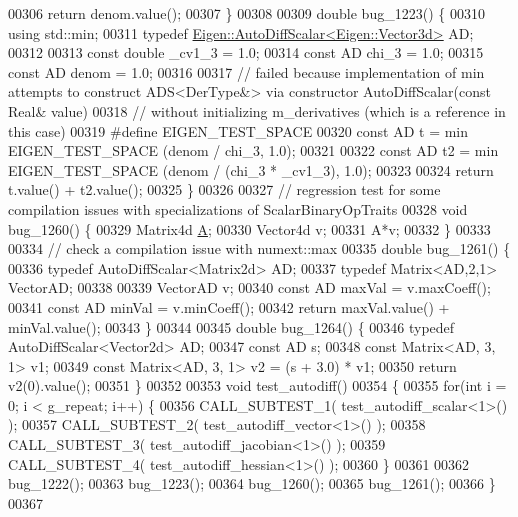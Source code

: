 \begin{DoxyCode}
00306   \textcolor{keywordflow}{return} denom.value();
00307 \}
00308 
00309 \textcolor{keywordtype}{double} bug\_1223() \{
00310   \textcolor{keyword}{using} std::min;
00311   \textcolor{keyword}{typedef} \hyperlink{class_eigen_1_1_auto_diff_scalar}{Eigen::AutoDiffScalar<Eigen::Vector3d>} AD;
00312 
00313   \textcolor{keyword}{const} \textcolor{keywordtype}{double} \_cv1\_3 = 1.0;
00314   \textcolor{keyword}{const} AD chi\_3 = 1.0;
00315   \textcolor{keyword}{const} AD denom = 1.0;
00316 
00317   \textcolor{comment}{// failed because implementation of min attempts to construct ADS<DerType&> via constructor
       AutoDiffScalar(const Real& value)}
00318   \textcolor{comment}{// without initializing m\_derivatives (which is a reference in this case)}
00319 \textcolor{preprocessor}{  #define EIGEN\_TEST\_SPACE}
00320   \textcolor{keyword}{const} AD t = min EIGEN\_TEST\_SPACE (denom / chi\_3, 1.0);
00321 
00322   \textcolor{keyword}{const} AD t2 = min EIGEN\_TEST\_SPACE (denom / (chi\_3 * \_cv1\_3), 1.0);
00323 
00324   \textcolor{keywordflow}{return} t.value() + t2.value();
00325 \}
00326 
00327 \textcolor{comment}{// regression test for some compilation issues with specializations of ScalarBinaryOpTraits}
00328 \textcolor{keywordtype}{void} bug\_1260() \{
00329   Matrix4d \hyperlink{group___core___module_class_eigen_1_1_matrix}{A};
00330   Vector4d v;
00331   A*v;
00332 \}
00333 
00334 \textcolor{comment}{// check a compilation issue with numext::max}
00335 \textcolor{keywordtype}{double} bug\_1261() \{
00336   \textcolor{keyword}{typedef} AutoDiffScalar<Matrix2d> AD;
00337   \textcolor{keyword}{typedef} Matrix<AD,2,1> VectorAD;
00338 
00339   VectorAD v;
00340   \textcolor{keyword}{const} AD maxVal = v.maxCoeff();
00341   \textcolor{keyword}{const} AD minVal = v.minCoeff();
00342   \textcolor{keywordflow}{return} maxVal.value() + minVal.value();
00343 \}
00344 
00345 \textcolor{keywordtype}{double} bug\_1264() \{
00346   \textcolor{keyword}{typedef} AutoDiffScalar<Vector2d> AD;
00347   \textcolor{keyword}{const} AD s;
00348   \textcolor{keyword}{const} Matrix<AD, 3, 1> v1;
00349   \textcolor{keyword}{const} Matrix<AD, 3, 1> v2 = (s + 3.0) * v1;
00350   \textcolor{keywordflow}{return} v2(0).value();
00351 \}
00352 
00353 \textcolor{keywordtype}{void} test\_autodiff()
00354 \{
00355   \textcolor{keywordflow}{for}(\textcolor{keywordtype}{int} i = 0; i < g\_repeat; i++) \{
00356     CALL\_SUBTEST\_1( test\_autodiff\_scalar<1>() );
00357     CALL\_SUBTEST\_2( test\_autodiff\_vector<1>() );
00358     CALL\_SUBTEST\_3( test\_autodiff\_jacobian<1>() );
00359     CALL\_SUBTEST\_4( test\_autodiff\_hessian<1>() );
00360   \}
00361 
00362   bug\_1222();
00363   bug\_1223();
00364   bug\_1260();
00365   bug\_1261();
00366 \}
00367 
\end{DoxyCode}
